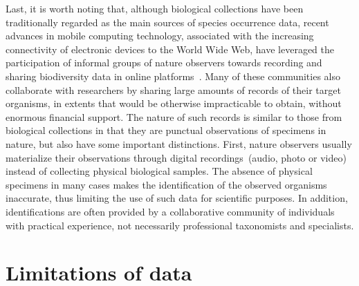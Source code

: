 Last, it is worth noting that, although biological collections have been traditionally regarded as the main sources of species occurrence data, recent advances in mobile computing technology, associated with the increasing connectivity of electronic devices to the World Wide Web, have leveraged the participation of informal groups of nature observers towards recording and sharing biodiversity data in online platforms~\cite{Silvertown2009}.
Many of these communities also collaborate with researchers by sharing large amounts of records of their target organisms, in extents that would be otherwise impracticable to obtain, without enormous financial support.
The nature of such records is similar to those from biological collections in that they are punctual observations of specimens in nature, but also have some important distinctions.
First, nature observers usually materialize their observations through digital recordings~(audio, photo or video) instead of collecting physical biological samples.
The absence of physical specimens in many cases makes the identification of the observed organisms inaccurate, thus limiting the use of such data for scientific purposes.
In addition, identifications are often provided by a collaborative community of individuals with practical experience, not necessarily professional taxonomists and specialists.

\section{Limitations of data} 
\label{section:limitdata}



